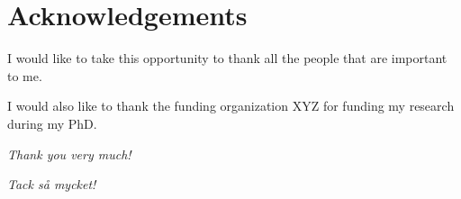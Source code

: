 \chapter{Acknowledgements}
\label{chap:acknowledgements}

I would like to take this opportunity to thank all the people that are important to me.

I would also like to thank the funding organization XYZ for funding my research during my PhD.

\medskip

\hfill \emph{Thank you very much!}

\medskip

\hfill \emph{Tack så mycket!}
